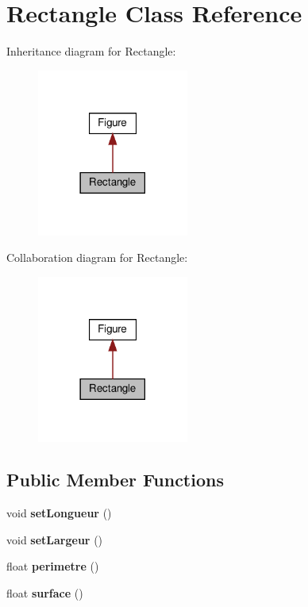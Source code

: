 \hypertarget{classRectangle}{}\section{Rectangle Class Reference}
\label{classRectangle}


Inheritance diagram for Rectangle\+:
\nopagebreak
\begin{figure}[H]
\begin{center}
\leavevmode
\includegraphics[width=141pt]{classRectangle__inherit__graph}
\end{center}
\end{figure}


Collaboration diagram for Rectangle\+:
\nopagebreak
\begin{figure}[H]
\begin{center}
\leavevmode
\includegraphics[width=141pt]{classRectangle__coll__graph}
\end{center}
\end{figure}
\subsection*{Public Member Functions}
\begin{DoxyCompactItemize}
\item 
\mbox{\label{classRectangle_ac082860a64438de4b24929b2c3ec0d64}} 
void {\bfseries set\+Longueur} ()
\item 
\mbox{\label{classRectangle_af4d96a3a059d94ce90bdce7adc96471b}} 
void {\bfseries set\+Largeur} ()
\item 
\mbox{\label{classRectangle_aabf428250df2d89c2c99e1692acde087}} 
float {\bfseries perimetre} ()
\item 
\mbox{\label{classRectangle_a388d3e127eb88cecf576fc861d938f5a}} 
float {\bfseries surface} ()
\end{DoxyCompactItemize}


